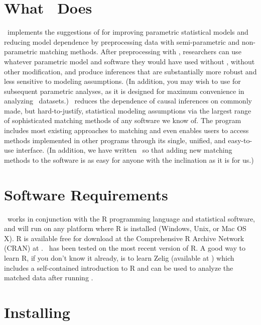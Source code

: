 
\section{What \MatchIt\ Does}

\MatchIt\ implements the suggestions of \citet*{HoImaKin06} for
improving parametric statistical models and reducing model dependence
by preprocessing data with semi-parametric and non-parametric matching
methods.  After preprocessing with \MatchIt, researchers can use
whatever parametric model and software they would have used without
\MatchIt, without other modification, and produce inferences that are
substantially more robust and less sensitive to modeling assumptions.
(In addition, you may wish to use
 \citep{ImaKinLau06} for
subsequent parametric analyses, as it is designed for maximum
convenience in analyzing \MatchIt\ datasets.)  \MatchIt\ reduces the
dependence of causal inferences on commonly made, but hard-to-justify,
statistical modeling assumptions via the largest range of
sophisticated matching methods of any software we know of.  The
program includes most existing approaches to matching and even enables
users to access methods implemented in other programs through its
single, unified, and easy-to-use interface.  (In addition, we have
written \MatchIt\ so that adding new matching methods to the software
is as easy for anyone with the inclination as it is for us.)

\section{Software Requirements} 
\label{sec:require}

\MatchIt\ works in conjunction with the R programming language and
statistical software, and will run on any platform where R is
installed (Windows, Unix, or Mac OS X).  R is available free for
download at the Comprehensive R Archive Network (CRAN) at
.
\MatchIt\ has been tested on the most recent version of R.  A good way
to learn R, if you don't know it already, is to learn Zelig (available
at
)
which includes a self-contained introduction to R and can be used to
analyze the matched data after running \MatchIt.

\section{Installing \MatchIt}
\label{sec:install}

